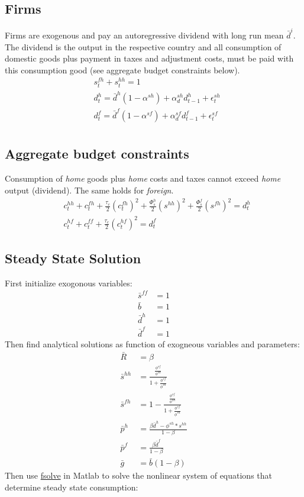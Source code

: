\documentclass[a4paper]{article}
\begin{document}
\subsection{Firms}
Firms are exogenous and pay an autoregressive dividend with long run mean $\bar d^i$. The dividend is the output in the respective country and all consumption of domestic goods plus payment in taxes and adjustment costs, must be paid with this consumption good (see aggregate budget constraints below).
\begin{align}
&s^{fh}_t+s^{hh}_t=1\\
&d^h_t=\bar d^h (1-\alpha^{sh}) +\alpha^{sh}_d d^h_{t-1} + \epsilon^{sh}_{t}\\
&d^f_t=\bar d^f (1-\alpha^{sf}) +\alpha^{sf}_d d^f_{t-1} + \epsilon^{sf}_{t}\\
\end{align}

\subsection{Aggregate budget constraints}
Consumption of \emph{home} goods plus \emph{home} costs and taxes cannot exceed \emph{home} output (dividend). The same holds for \emph{foreign}.
\begin{align}
&c^{hh}_t+c^{fh}_t + \frac{\tau_c}{2} (c^{fh}_t)^2 +\frac{\Phi^{h}_s}{2}(s^{hh})^2 + \frac{\Phi^f_s}{2}(s^{fh})^2 =d^h_t \label{aggregatebc} \\
&c^{hf}_t + c^{ff}_t + \frac{\tau_c}{2} (c^{hf}_t)^2 = d^f_t \label{aggregatebcc}
\end{align}


\subsection{Steady State Solution}
First initialize exogonous variables:
\begin{align*}
\bar s^{ff}&=1\\
\bar b &= 1\\
\bar d^h &= 1\\
\bar d^f &=1
\end{align*}
Then find analytical solutions as function of exogneous variables and parameters:
\begin{align*}
\bar R&=\beta \\
\bar s^{hh} &= \frac{\frac{\phi^{sf}}{\phi^{sh}}}{1+\frac{\phi^{sf}}{\phi^{sh}}}\\
\bar s^{fh} &= 1 -\frac{\frac{\phi^{sf}}{\phi^{sh}}}{1+\frac{\phi^{sf}}{\phi^{sh}}}\\
\bar p^h &= \frac{\beta  \bar d^h -\phi^{sh}*s^{hh}}{1-\beta}\\
\bar p^f &= \frac{\beta \bar d^f}{1-\beta}\\
\bar g&=\bar b(1-\beta)
\end{align*}
Then use \url{fsolve} in Matlab to solve the nonlinear system of equations that determine steady state consumption:
\end{document}

